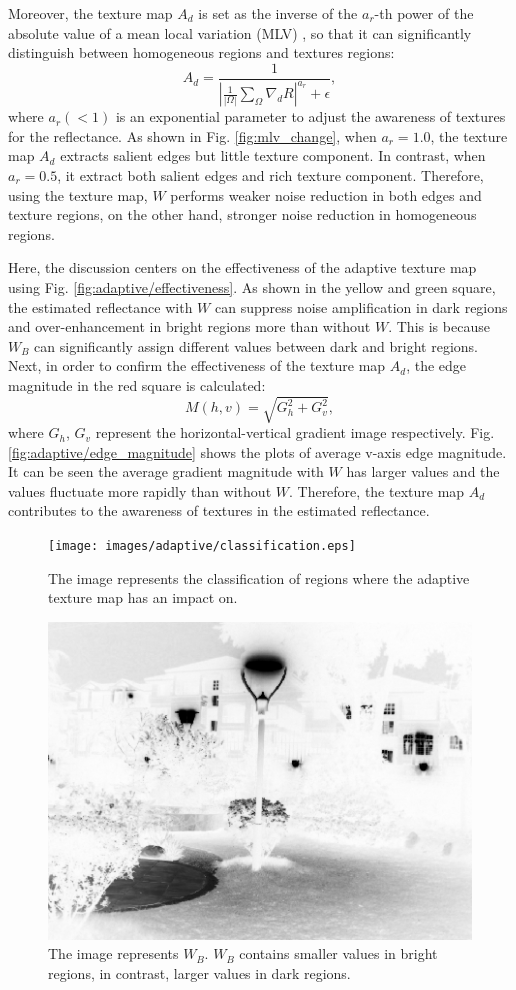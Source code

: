 Moreover, the texture map $A_{d}$ is set as the inverse of the $a_{r}$-th power of the absolute value of a mean local variation (MLV) \cite{jiep}, so that it can significantly distinguish between homogeneous regions and textures regions:
\begin{equation}
A_{d} = \frac{1}{\left |\frac{1}{|\Omega|}\sum_{\Omega}\nabla_{d}{R} \right|^{a_{r}} + \epsilon}, \label{eq: mlv}
\end{equation}
where $a_{r} (< 1)$ is an exponential parameter to adjust the awareness of textures for the reflectance.
As shown in Fig. \ref{fig:mlv_change}, when $a_{r}=1.0$, the texture map $A_{d}$ extracts salient edges but little texture component. In contrast, when $a_{r}=0.5$, it extract both salient edges and rich texture component. Therefore, using the texture map, $W$ performs weaker noise reduction in both edges and texture regions, on the other hand, stronger noise reduction in homogeneous regions.\par
Here, the discussion centers on the effectiveness of the adaptive texture map using Fig. \ref{fig:adaptive/effectiveness}.
As shown in the yellow and green square, the estimated reflectance with $W$ can suppress noise amplification in dark regions and over-enhancement in bright regions more than without $W$. This is because $W_{B}$ can significantly assign different values between dark and bright regions. 
Next, in order to confirm the effectiveness of the texture map $A_{d}$, the edge magnitude in the red square is calculated:
\begin{equation}
M(h, v) = \sqrt{G_{h} ^{2}+ G_{v}^{2}}, \label{eq:maginitude}
\end{equation}
where $G_{h}$, $G_{v}$ represent the horizontal-vertical gradient image respectively. Fig.\ref{fig:adaptive/edge_magnitude} shows the plots of average v-axis edge magnitude. It can be seen the average gradient magnitude with $W$ has larger values and the values fluctuate more rapidly than without $W$. Therefore, the texture map $A_{d}$ contributes to the awareness of textures in the estimated reflectance.
\begin{figure}[tb]
	\centering
	\texttt{[image: images/adaptive/classification.eps]}
	\caption{The image represents the classification of regions where the adaptive texture map has an impact on.} \label{fig:adaptive/classification}
\end{figure}
\begin{figure}[tb]
	\centering
	\includegraphics[width=0.5\hsize]{images/adaptive/wb.eps}
	\caption{The image represents $W_{B}$. $W_{B}$ contains smaller values in bright regions, in contrast, larger values in dark regions.} \label{fig:adaptive/wb}
\end{figure}
